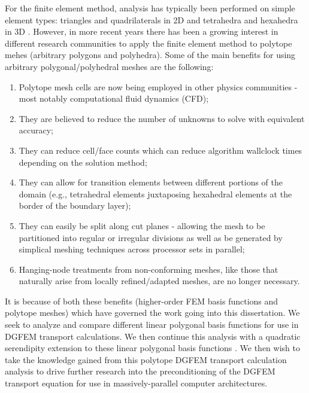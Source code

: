 \documentclass[11pt]{article}
\begin{document}
For the finite element method, analysis has typically been performed on simple element types: triangles and quadrilaterals in 2D and tetrahedra and hexahedra in 3D \cite{akin1982application}. However, in more recent years there has been a growing interest in different research communities to apply the finite element method to polytope mehes (arbitrary polygons and polyhedra). Some of the main benefits for using arbitrary polygonal/polyhedral meshes are the following:

\vspace{4mm}
\begin{enumerate}
	\item Polytope mesh cells are now being employed in other physics communities - most notably computational fluid dynamics (CFD)\cite{ref::star_CCM};
	\item They are believed to reduce the number of unknowns to solve with equivalent accuracy;
	\item They can reduce cell/face counts which can reduce algorithm wallclock times depending on the solution method;
	\item They can allow for transition elements between different portions of the domain (e.g., tetrahedral elements juxtaposing hexahedral elements at the border of the boundary layer);
	\item They can easily be split along cut planes - allowing the mesh to be partitioned into regular or irregular divisions as well as be generated by simplical meshing techniques across processor sets in parallel;
	\item Hanging-node treatments from non-conforming meshes, like those that naturally arise from locally refined/adapted meshes, are no longer necessary. 
\end{enumerate}
\vspace{4mm}

It is because of both these benefits (higher-order FEM basis functions and polytope meshes) which have governed the work going into this dissertation. We seek to analyze and compare different linear polygonal basis functions  for use in DGFEM transport calculations. We then continue this analysis with a quadratic serendipity extension to these linear polygonal basis functions \cite{rand2014quadratic}. We then wish to take the knowledge gained from this polytope DGFEM transport calculation analysis to drive further research into the preconditioning of the DGFEM transport equation for use in massively-parallel computer architectures.
\end{document}
